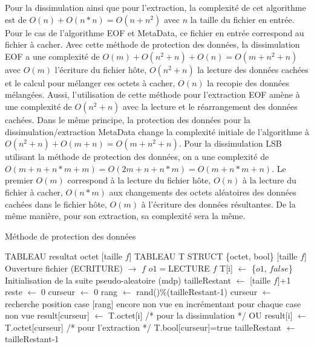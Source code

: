 \documentclass[11pt]{article}
\begin{document}
\begin{minipage}{.6\textwidth}
Pour la dissimulation ainsi que pour l'extraction, la complexité de cet 
algorithme est de $O(n)+O(n*n)=O(n+n^2)$ avec $n$ la taille
du fichier en entrée. \newline 
Pour le cas de l'algorithme EOF et MetaData, ce fichier en entrée correspond 
au fichier à cacher. \newline
Avec cette méthode de protection des données, la dissimulation EOF a une 
complexité de $O(m)+O(n^2+n)+O(n)=O(m+n^2+n)$ avec $O(m)$ l'écriture du 
fichier hôte, $O(n^2+n)$ la lecture des données cachées et le calcul pour 
mélanger ces octets à cacher, $O(n)$ la recopie des données mélangées. 
\newline
Aussi, l'utilisation de cette méthode pour l'extraction EOF amène à une 
complexité de $O(n^2+n)$ avec la lecture et le réarrangement 
des données cachées. 
\newline \newline
Dans le même principe, la protection des données pour la dissimulation/extraction 
MetaData change la complexité initiale de l'algorithme à $O(n^2+n)+O(m+n)=O(m+n^2+n)$. 
\newline \newline
Pour la dissimulation LSB utilisant la méthode de protection 
des données, on a une complexité de $O(m+n+n*m+m)=O(2m+n+n*m)=O(m+n*m+n)$. Le premier $O(m)$ 
correspond à la lecture du fichier hôte, $O(n)$ à la lecture du fichier à cacher, 
$O(n*m)$ aux changements des octets aléatoires des données cachées dans le fichier hôte, 
$O(m)$ à l'écriture des données résultantes. \newline
De la même manière, pour son extraction, sa complexité sera la même. 
\end{minipage}
\begin{minipage}{.3\textwidth}
 
\end{minipage}
\begin{minipage}{.4\textwidth}
\begin{algorithm}[H]
\caption{Méthode de protection des données}
\begin{algorithmic}
\footnotesize
\STATE TABLEAU resultat {octet} [taille $f$]
\STATE TABLEAU T STRUCT \{octet, bool\} [taille $f$]
\STATE Ouverture fichier (ECRITURE) $\rightarrow$ $f$
\STATE $o1 = $LECTURE $f$
\STATE T[i] $\leftarrow$ \{$o1$, $false$\}
\ENDFOR
\STATE Initialisation de la suite pseudo-aleatoire (mdp)
\STATE tailleRestant $\leftarrow$ [taille $f$]+1
\STATE reste $\leftarrow$ 0
\STATE curseur $\leftarrow$ 0
\STATE rang $\leftarrow$ rand()\%(tailleRestant-1)
\STATE curseur $\leftarrow$ recherche position case [rang] encore non vue 
en incrémentant pour chaque case non vue
\color{red}
\STATE result[curseur] $\leftarrow$ T.octet[i] /* pour la dissimulation */
\color{black} OU \color{blue} result[i] $\leftarrow$ T.octet[curseur] /* pour l'extraction */
\color{black}
\STATE T.bool[curseur]=true
\STATE tailleRestant $\leftarrow$ tailleRestant-1
\ENDFOR
\normalsize
\end{algorithmic}
\end{algorithm}
\end{minipage}
\end{document}
